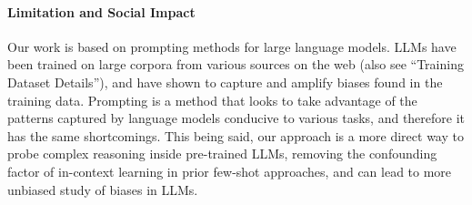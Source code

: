 \paragraph{Limitation and Social Impact}
 Our work is based on prompting methods for large language models. LLMs have been trained on large corpora from various sources on the web
 (also see ``Training Dataset Details''),
 and have shown to capture and amplify biases found in the training data. Prompting is a method that looks to take advantage of the patterns captured by language models conducive to various tasks, and therefore it has the same shortcomings. This being said, our approach is a more direct way to probe complex reasoning inside pre-trained LLMs, removing the confounding factor of in-context learning in prior few-shot approaches, and can lead to more unbiased study of biases in LLMs.




